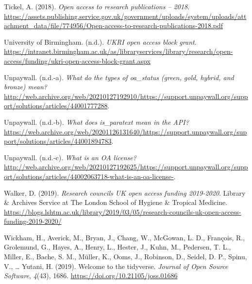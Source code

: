 \documentclass[a4paper,man,floatsintext,longtable,noextraspace,12pt]{apa6}
\newenvironment{CSLReferences}%
  {}%
  {\par}
\begin{document}
\begin{CSLReferences}{1}{0}
\leavevmode\hypertarget{ref-Tickel_2018}{}%
Tickel, A. (2018). \emph{Open access to research publications -- 2018}.
\url{https://assets.publishing.service.gov.uk/government/uploads/system/uploads/attachment_data/file/774956/Open-access-to-research-publications-2018.pdf}

\leavevmode\hypertarget{ref-birmingham}{}%
University of Birmingham. (n.d.). \emph{UKRI open access block grant}.
\url{https://intranet.birmingham.ac.uk/as/libraryservices/library/research/open-access/funding/ukri-open-access-block-grant.aspx}

\leavevmode\hypertarget{ref-Unpaywall_types}{}%
Unpaywall. (n.d.-a). \emph{{What do the types of oa\_status (green,
gold, hybrid, and bronze) mean?}}
\url{http://web.archive.org/web/20210127192910/https://support.unpaywall.org/support/solutions/articles/44001777288}.

\leavevmode\hypertarget{ref-Unpaywall_para}{}%
Unpaywall. (n.d.-b). \emph{{What does is\_paratext mean in the API?}}
\url{https://web.archive.org/web/20201126131640/https://support.unpaywall.org/support/solutions/articles/44001894783}.

\leavevmode\hypertarget{ref-Unpaywall_oa_license}{}%
Unpaywall. (n.d.-c). \emph{{What is an OA license?}}
\url{http://web.archive.org/web/20210127192625/https://support.unpaywall.org/support/solutions/articles/44002063718-what-is-an-oa-license-}.

\leavevmode\hypertarget{ref-walker_2019}{}%
Walker, D. (2019). \emph{Research councils UK open access funding
2019-2020}. Library \& Archives Service at The London School of Hygiene
\& Tropical Medicine.
\url{https://blogs.lshtm.ac.uk/library/2019/03/05/research-councils-uk-open-access-funding-2019-2020/}

\leavevmode\hypertarget{ref-tidyverse}{}%
Wickham, H., Averick, M., Bryan, J., Chang, W., McGowan, L. D.,
François, R., Grolemund, G., Hayes, A., Henry, L., Hester, J., Kuhn, M.,
Pedersen, T. L., Miller, E., Bache, S. M., Müller, K., Ooms, J.,
Robinson, D., Seidel, D. P., Spinu, V., \ldots{} Yutani, H. (2019).
Welcome to the {tidyverse}. \emph{Journal of Open Source Software},
\emph{4}(43), 1686. \url{https://doi.org/10.21105/joss.01686}

\end{CSLReferences}
\end{document}
